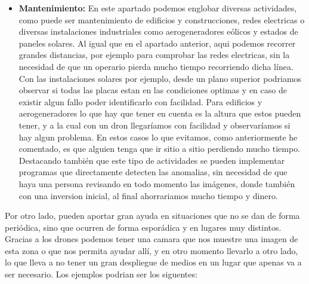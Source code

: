 \begin{itemize}
	\item \textbf{Mantenimiento:} En este apartado podemos englobar diversas actividades, como puede ser mantenimiento de edificios y construcciones, redes electricas o diversas instalaciones industriales como aerogeneradores e\'olicos y estados de paneles solares. Al igual que en el apartado anterior, aqui podemos recorrer grandes distancias, por ejemplo para comprobar las redes electricas, sin la necesidad de que un operario pierda mucho tiempo recorriendo dicha l\'inea. Con las instalaciones solares por ejemplo, desde un plano superior podriamos observar si todas las placas estan en las condiciones optimas y en caso de existir algun fallo poder identificarlo con facilidad. Para edificios y aerogeneradores lo que hay que tener en cuenta es la altura que estos pueden tener, y a la cual con un dron llegar\'iamos con facilidad y observar\'iamos si hay algun problema. En estos casos lo que evitamos, como anteriormente he comentado, es que alguien tenga que ir sitio a sitio perdiendo mucho tiempo. Destacando tambi\'en que este tipo de actividades se pueden implementar programas que directamente detecten las anomalias, sin necesidad de que haya una persona revisando en todo momento las im\'agenes, donde tambi\'en con una inversion inicial, al final ahorrariamos mucho tiempo y dinero. 
\end{itemize}

\hspace{1 cm} Por otro lado, pueden aportar gran ayuda en situaciones que no se dan de forma peri\'odica, sino que ocurren de forma espor\'adica y en lugares muy distintos. Gracias a los drones podemos tener una camara que nos muestre una imagen de esta zona o que nos permita ayudar all\'i, y en otro momento llevarlo a otro lado, lo que lleva a no tener un gran despliegue de medios en un lugar que apenas va a ser necesario. Los ejemplos podrian ser los siguentes:

